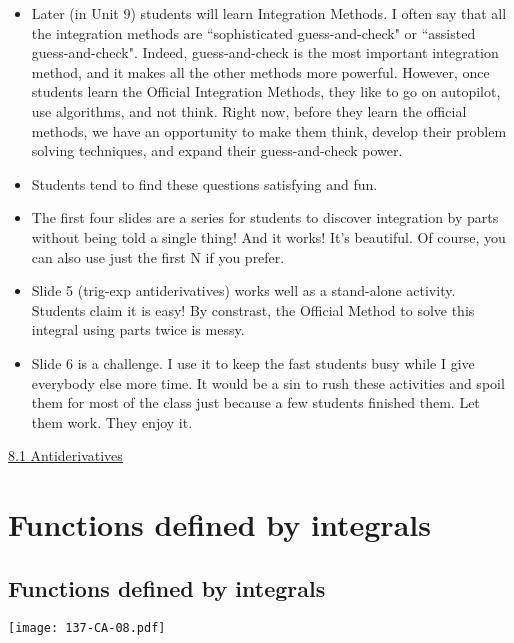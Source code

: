 \documentclass[11pt]{article}
\newcommand{\nl}{\hfill \vspace{-1.1\baselineskip}} %
\newcommand{\vi}{\hspace{8mm} \href{https://www.youtube.com/watch?v=xcyL3sEL2mM&list=PLlwePzQY_wW_8-sITAbG_GU2JgiuwXkDN&index=1}{8.1 Antiderivatives}}
\begin{document}
\begin{comments}
\nl
	\begin{itemize}
		\item  Later (in Unit 9) students will learn Integration Methods.  I often say that all the integration methods are ``sophisticated guess-and-check" or ``assisted guess-and-check".  Indeed, guess-and-check is the most important integration method, and it makes all the other methods more powerful.   However, once students learn the Official Integration Methods, they like to go on autopilot, use algorithms, and not think.  Right now, before they learn the official methods, we have an opportunity to make them think, develop their problem solving techniques, and expand their guess-and-check power.
		\item Students tend to find these questions satisfying and fun.
		\item The first four slides are a series for students to discover integration by parts without being told a single thing!  And it works!  It's beautiful.  Of course, you can also use just the first N if you prefer.
		\item Slide 5 (trig-exp antiderivatives) works well as a stand-alone activity.   Students claim it is easy!   By constrast, the Official Method to solve this integral using parts twice is messy.
		\item Slide 6 is a challenge.   I use it to keep the fast students busy while I give everybody else more time.    It would be a sin to rush these activities and spoil them for most of the class just because a few students finished them.   Let them work.  They enjoy it.
	\end{itemize}
\end{comments}

\begin{videos}
\vi
\end{videos}

\newpage
\section{Functions defined by integrals}
\subsection{Functions defined by integrals}

\begin{center}
{ \texttt{[image: 137-CA-08.pdf]}} 
\end{center}
\end{document}
